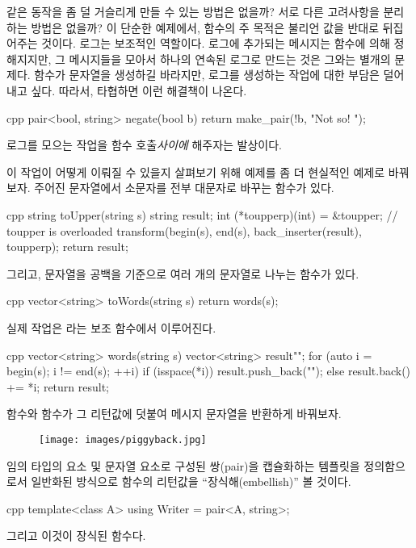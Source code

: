 같은 동작을 좀 덜 거슬리게 만들 수 있는 방법은 없을까? 서로 다른 고려사항을 분리하는 방법은 없을까? 이 단순한 예제에서,  함수의 주 목적은 불리언 값을 반대로 뒤집어주는 것이다.
로그는 보조적인 역할이다. 로그에 추가되는 메시지는 함수에 의해 정해지지만, 그 메시지들을 모아서 하나의 연속된 로그로 만드는 것은 그와는 별개의 문제다.
함수가 문자열을 생성하길 바라지만, 로그를 생성하는 작업에 대한 부담은 덜어내고 싶다. 따라서, 타협하면 이런 해결책이 나온다.

\begin{snip}{cpp}
pair<bool, string> negate(bool b) {
    return make_pair(!b, "Not so! ");
}
\end{snip}
로그를 모으는 작업을 함수 호출\emph{사이에} 해주자는 발상이다.

이 작업이 어떻게 이뤄질 수 있을지 살펴보기 위해 예제를 좀 더 현실적인 예제로 바꿔보자. 주어진 문자열에서 소문자를 전부 대문자로 바꾸는 함수가 있다.

\begin{snip}{cpp}
string toUpper(string s) {
    string result;
    int (*toupperp)(int) = &toupper; // toupper is overloaded
    transform(begin(s), end(s), back_inserter(result), toupperp);
    return result;
}
\end{snip}
그리고, 문자열을 공백을 기준으로 여러 개의 문자열로 나누는 함수가 있다.

\begin{snip}{cpp}
vector<string> toWords(string s) {
    return words(s);
}
\end{snip}
실제 작업은 라는 보조 함수에서 이루어진다.

\begin{snip}{cpp}
vector<string> words(string s) {
    vector<string> result{""};
    for (auto i = begin(s); i != end(s); ++i)
    {
        if (isspace(*i))
            result.push_back(""); 
        else
            result.back() += *i;
    }
    return result;
}
\end{snip}
 함수와  함수가 그 리턴값에 덧붙여 메시지 문자열을 반환하게 바꿔보자.

\begin{figure}[H]
\centering
\texttt{[image: images/piggyback.jpg]}
\end{figure}
\noindent
임의 타입의 요소 및 문자열 요소로 구성된 쌍(pair)을 캡슐화하는  템플릿을 정의함으로서 일반화된 방식으로 함수의 리턴값을 ``장식해(embellish)'' 볼 것이다.

\begin{snip}{cpp}
template<class A>
using Writer = pair<A, string>;
\end{snip}
그리고 이것이 장식된 함수다.

